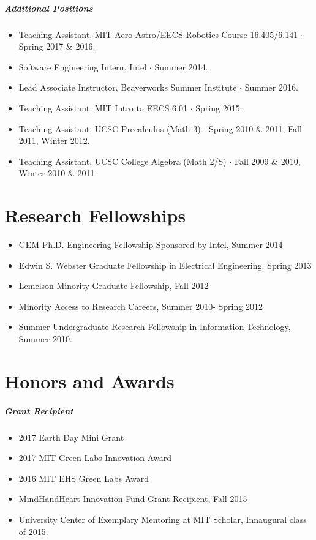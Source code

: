 \documentclass[10pt,letterpaper]{article}
\begin{document}
\begin{spacing}{.7}
\subparagraph{Additional Positions}
\begin{itemize}

    \item Teaching Assistant, MIT Aero-Astro/EECS Robotics Course 16.405/6.141  $\cdot$ Spring 2017 \&  2016.
\item Software Engineering Intern, Intel $\cdot$ Summer 2014.
\item Lead Associate Instructor, Beaverworks Summer Institute  $\cdot$ Summer 2016.
\item Teaching Assistant, MIT Intro to EECS 6.01  $\cdot$ Spring 2015.
\item Teaching Assistant, UCSC Precalculus (Math 3) $\cdot$ Spring 2010 \& 2011, Fall 2011, Winter 2012.
\item Teaching Assistant, UCSC College Algebra (Math 2/S) $\cdot$ Fall 2009 \& 2010, Winter 2010 \& 2011.
\end{itemize}



\section*{Research Fellowships}
\begin{itemize}
\item GEM Ph.D. Engineering Fellowship Sponsored by Intel, Summer 2014
\item  Edwin S. Webster Graduate Fellowship in Electrical Engineering, Spring 2013
\item Lemelson Minority Graduate Fellowship, Fall 2012
\item Minority Access to Research Careers, Summer 2010- Spring 2012
\item  Summer Undergraduate Research Fellowship in Information Technology, Summer 2010.  
\end{itemize}


\section*{Honors and Awards}
\subparagraph{Grant Recipient}
\begin{itemize}
\item 2017 Earth Day Mini Grant 
\item 2017 MIT Green Labs Innovation Award
\item 2016 MIT EHS Green Labs Award 
\item MindHandHeart Innovation Fund Grant Recipient, Fall 2015
\item University Center of Exemplary Mentoring at MIT Scholar, Innaugural class of 2015.
\end{itemize}


\end{spacing}
\end{document}
